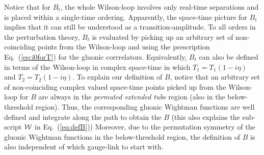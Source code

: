 \documentclass[a4paper,11pt]{article}
\begin{document}
Notice that for $B_t$, the whole Wilson-loop involves only real-time separations and is placed within a single-time ordering. Apparently, the space-time picture for $B_t$ implies that it can still be understood as a transition-amplitude. To all orders in the perturbation theory, $B_t$ is evaluated by picking up an arbitrary set of non-coinciding points from the Wilson-loop and using the prescription Eq.~(\ref{eq:i0forT}) for the gluonic corrrelators. Equivalently, $B_t$ can also be defined in terms of the Wilson-loop in complex space-time in which $T_1=T_1(1-i\eta)$ and $T_2=T_2(1-i\eta)$. To explain our definition of $B$, notice that an arbitrary set of non-coinciding complex valued space-time points picked up from the Wilson-loop for $B$ are always in the {\it permuted extended tube} region (also in the below-threshold region). Thus, the corresponding gluonic Wightman functions are well defined and integrate along the path to obtain the $B$ (this also explains the sub-script ${\cal W}$ in Eq.~(\ref{eq:defB})) Moreover, due to the permutation symmetry of the gluonic Wightman functions in the below-threshold region, the definition of $B$ is also independent of which gauge-link to start with. 
\end{document}
